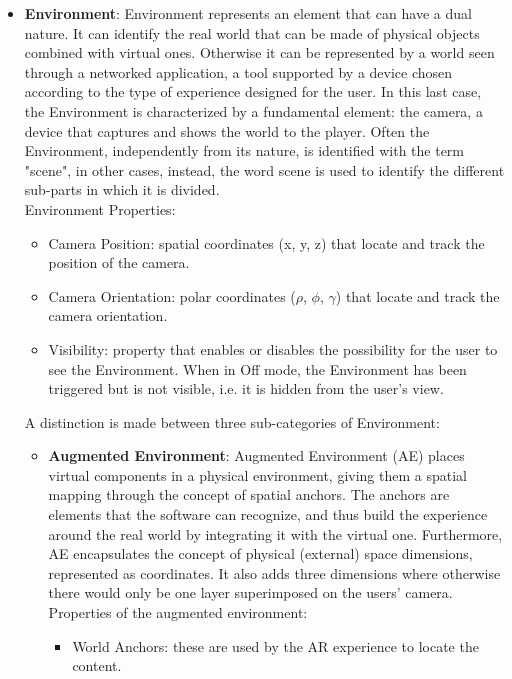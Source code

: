 \begin{itemize}
\begin{itemize}
        \item \textbf{Environment}: Environment represents an element that can have a dual nature. It can identify the real world that can be made of physical objects combined with virtual ones. Otherwise it can be represented by a world seen through a networked application, a tool supported by a device chosen according to the type of experience designed for the user. In this last case, the Environment is characterized by a fundamental element: the camera, a device that captures and shows the world to the player. Often the Environment, independently from its nature, is identified with the term "scene", in other cases, instead, the word scene is used to identify the different sub-parts in which it is divided. \\
        Environment Properties:
        \begin{itemize}
            \item Camera Position: spatial coordinates (x, y, z) that locate and track the position of the camera.
            \item Camera Orientation: polar coordinates ($\rho$, $\phi$, $\gamma$) that locate and track the camera orientation.
            \item Visibility: property that enables or disables the possibility for the user to see the Environment. When in Off mode, the Environment has been triggered but is not visible, i.e. it is hidden from the user's view. 
        \end{itemize}
        A distinction is made between three sub-categories of Environment:
        \begin{itemize}
            \item \textbf{Augmented Environment}: Augmented Environment (AE) places virtual components in a physical environment, giving them a spatial mapping through the concept of spatial anchors. The anchors are elements that the software can recognize, and thus build the experience around the real world by integrating it with the virtual one. Furthermore, AE encapsulates the concept of physical (external) space dimensions, represented as coordinates. It also adds three dimensions where otherwise there would only be one layer superimposed on the users' camera.\\
            Properties of the augmented environment:
            \begin{itemize}
                \item World Anchors: these are used by the AR experience to locate the content.

\end{itemize}
\end{itemize}
\end{itemize}
\end{itemize}
